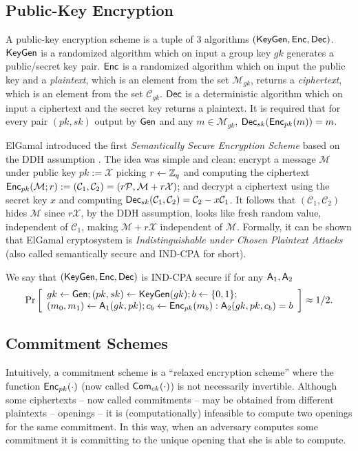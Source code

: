 \subsection{Public-Key Encryption}

A public-key encryption scheme is a tuple of 3 algorithms $(\mathsf{KeyGen},\mathsf{Enc},\mathsf{Dec})$. $\mathsf{KeyGen}$ is a randomized algorithm which on input a group key $gk$ generates a public/secret key pair. $\mathsf{Enc}$ is a randomized algorithm which on input the public key and a \emph{plaintext}, which is an element from the set $\mathcal{M}_{gk}$, returns a \emph{ciphertext}, which is an element from the set $\mathcal{C}_{gk}$. $\mathsf{Dec}$ is a deterministic algorithm which on input a ciphertext and the secret key returns a plaintext. It is required that for every pair $(pk,sk)$ output by $\mathsf{Gen}$ and any $m\in\mathcal{M}_{gk}$, $\mathsf{Dec}_{sk}(\mathsf{Enc}_{pk}(m))=m$.

ElGamal introduced the first \emph{Semantically Secure Encryption Scheme} based on the DDH assumption \cite{ElGamal85}. The idea was simple and clean: encrypt a message $\mathcal{M}$ under public key $pk:=\mathcal{X}$ picking $r\gets\mathbb{Z}_q$ and computing the ciphertext $\mathsf{Enc}_{pk}(\mathcal{M};r):=(\mathcal{C}_1,\mathcal{C}_2)=(r\mathcal{P},\mathcal{M}+r\mathcal{X})$; and decrypt a ciphertext using the secret key $x$ and computing $\mathsf{Dec}_{sk}(\mathcal{C}_1,\mathcal{C}_2)=\mathcal{C}_2-x\mathcal{C}_1$. It follows that $(\mathcal{C}_1,\mathcal{C}_2)$ hides $\mathcal{M}$ since $r\mathcal{X}$, by the DDH assumption, looks like fresh random value, independent of $\mathcal{C}_1$, making $\mathcal{M}+r\mathcal{X}$ independent of $\mathcal{M}$. Formally, it can be shown that ElGamal cryptosystem is \emph{Indistinguishable under Chosen Plaintext Attacks} (also called semantically secure and IND-CPA for short).

\begin{definition}
We say that $(\mathsf{KeyGen},\mathsf{Enc},\mathsf{Dec})$ is IND-CPA secure if for any $\mathsf{A}_1,\mathsf{A}_2$
$$
\Pr\left[\begin{array}{l}
gk\gets\mathsf{Gen};(pk,sk)\gets\mathsf{KeyGen}(gk);b\gets\{0,1\};\\
(m_0,m_1)\gets\mathsf{A}_1(gk,pk);
c_b\gets\mathsf{Enc}_{pk}(m_b):\mathsf{A}_2(gk,pk,c_b)=b
\end{array}\right]\approx 1/2.
$$
\end{definition}

\subsection{Commitment Schemes}
Intuitively, a commitment scheme is a ``relaxed encryption scheme'' where the function $\mathsf{Enc}_{pk}(\cdot)$ (now called $\mathsf{Com}_{ck}(\cdot)$) is not necessarily invertible. Although some ciphertexts -- now called commitments -- may be obtained from different plaintexts -- openings -- it is (computationally) infeasible to compute two openings for the same commitment. In this way, when an adversary computes some commitment it is committing to the unique opening that she is able to compute.
 
